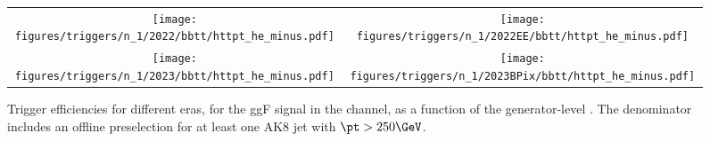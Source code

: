 
    \begin{figure}[H]
        \centering
        \begin{tabular}{cc}
            \texttt{[image: figures/triggers/n\_1/2022/bbtt/httpt\_he\_minus.pdf]} &
            \texttt{[image: figures/triggers/n\_1/2022EE/bbtt/httpt\_he\_minus.pdf]} \\[1ex]
            \texttt{[image: figures/triggers/n\_1/2023/bbtt/httpt\_he\_minus.pdf]} &
            \texttt{[image: figures/triggers/n\_1/2023BPix/bbtt/httpt\_he\_minus.pdf]}
            \label{fig}
        \end{tabular}
\caption{Trigger efficiencies for different eras, for the ggF \HHbbtt signal in the \tauhe channel, as a function of the generator-level \htata \pt. The denominator includes an offline preselection for at least one AK8 jet with $\pt > 250\GeV$.}
\label{fig:triggers_n-1_bbtt_he_httpt}
\end{figure}
